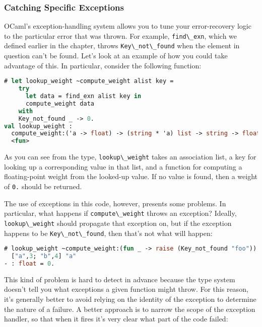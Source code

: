 \hypertarget{catching-specific-exceptions}{%
\subsubsection{Catching Specific
Exceptions}\label{catching-specific-exceptions}}

OCaml's exception-handling system allows you to tune your error-recovery
logic to the particular error that was thrown. For example,
\passthrough{\lstinline!find\_exn!}, which we defined earlier in the
chapter, throws \passthrough{\lstinline!Key\_not\_found!} when the
element in question can't be found. Let's look at an example of how you
could take advantage of this. In particular, consider the following
function:

\begin{lstlisting}[language=Caml]
# let lookup_weight ~compute_weight alist key =
    try
      let data = find_exn alist key in
      compute_weight data
    with
    Key_not_found _ -> 0.
val lookup_weight :
  compute_weight:('a -> float) -> (string * 'a) list -> string -> float =
  <fun>
\end{lstlisting}

As you can see from the type, \passthrough{\lstinline!lookup\_weight!}
takes an association list, a key for looking up a corresponding value in
that list, and a function for computing a floating-point weight from the
looked-up value. If no value is found, then a weight of
\passthrough{\lstinline!0.!} should be returned.

The use of exceptions in this code, however, presents some problems. In
particular, what happens if \passthrough{\lstinline!compute\_weight!}
throws an exception? Ideally, \passthrough{\lstinline!lookup\_weight!}
should propagate that exception on, but if the exception happens to be
\passthrough{\lstinline!Key\_not\_found!}, then that's not what will
happen:

\begin{lstlisting}[language=Caml]
# lookup_weight ~compute_weight:(fun _ -> raise (Key_not_found "foo"))
  ["a",3; "b",4] "a"
- : float = 0.
\end{lstlisting}

This kind of problem is hard to detect in advance because the type
system doesn't tell you what exceptions a given function might throw.
For this reason, it's generally better to avoid relying on the identity
of the exception to determine the nature of a failure. A better approach
is to narrow the scope of the exception handler, so that when it fires
it's very clear what part of the code failed:

